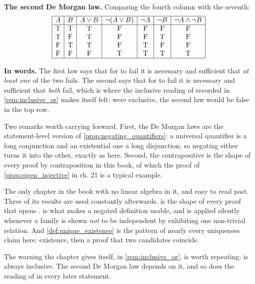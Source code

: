 \begin{exercisesolution}
\textbf{The second De Morgan law.} Comparing the fourth column with the seventh:
\[
\begin{array}{|c|c|c|c|c|c|c|}
\hline
A & B & A \vee B & \neg(A \vee B) & \neg A & \neg B & \neg A \wedge \neg B \\
\hline
\text{T} & \text{T} & \text{T} & \text{F} & \text{F} & \text{F} & \text{F} \\
\text{T} & \text{F} & \text{T} & \text{F} & \text{F} & \text{T} & \text{F} \\
\text{F} & \text{T} & \text{T} & \text{F} & \text{T} & \text{F} & \text{F} \\
\text{F} & \text{F} & \text{F} & \text{T} & \text{T} & \text{T} & \text{T} \\
\hline
\end{array}
\]

\textbf{In words.} The first law says that for  to fail it is necessary and sufficient that \emph{at least one} of the two fails. The second says that for  to fail it is necessary and sufficient that \emph{both} fail, which is where the inclusive reading of  recorded in \cref{rem:inclusive_or} makes itself felt: were  exclusive, the second law would be false in the top row.

Two remarks worth carrying forward. First, the De Morgan laws are the statement-level version of \cref{prop:negating_quantifiers}: a universal quantifier is a long conjunction and an existential one a long disjunction, so negating either turns it into the other, exactly as here. Second, the contrapositive is the shape of every proof by contraposition in this book, of which the proof of \cref{prop:eigen_injective} in ch. 21 is a typical example.
\end{exercisesolution}

\begin{ainote}
The only chapter in the book with no linear algebra in it, and easy to read past.
Three of its results are used constantly afterwards. 
is the shape of every proof that opens .
 is what makes a negated definition usable, and
is applied silently whenever a family is shown \emph{not} to be independent by
exhibiting one non-trivial relation. And \cref{def:unique_existence} is the
pattern of nearly every uniqueness claim here: existence, then a proof that two
candidates coincide.

The warning the chapter gives itself, in \cref{rem:inclusive_or}, is worth
repeating:  is always inclusive. The second De Morgan law depends on it,
and so does the reading of  in every later statement.
\end{ainote}




